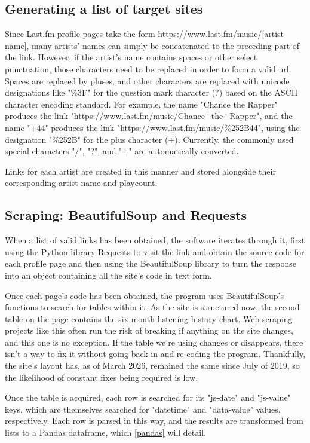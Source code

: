 \subsection{Generating a list of target sites}

Since Last.fm profile pages take the form https://www.last.fm/music/[artist name], many artists' names can simply be concatenated to the preceding part of the link. However, if the artist's name contains spaces or other select punctuation, those characters need to be replaced in order to form a valid url. Spaces are replaced by pluses, and other characters are replaced with unicode designations like "\%3F" for the question mark character (?) based on the ASCII character encoding standard. For example, the name "Chance the Rapper" produces the link "https://www.last.fm/music/Chance+the+Rapper", and the name "+44" produces the link "https://www.last.fm/music/\%252B44", using the designation "\%252B" for the plus character (+). Currently, the commonly used special characters "/", "?", and "+" are automatically converted. 

Links for each artist are created in this manner and stored alongside their corresponding artist name and playcount.

\subsection{Scraping: BeautifulSoup and Requests}

When a list of valid links has been obtained, the software iterates through it, first using the Python library Requests to visit the link and obtain the source code for each profile page and then using the BeautifulSoup library to turn the response into an object containing all the site's code in text form.

Once each page's code has been obtained, the program uses BeautifulSoup's functions to search for tables within it. As the site is structured now, the second table on the page contains the six-month listening history chart. Web scraping projects like this often run the risk of breaking if anything on the site changes, and this one is no exception. If the table we're using changes or disappears, there isn't a way to fix it without going back in and re-coding the program. Thankfully, the site's layout has, as of March 2026, remained the same since July of 2019, so the likelihood of constant fixes being required is low.

Once the table is acquired, each row is searched for its "js-date" and "js-value" keys, which are themselves searched for "datetime" and "data-value" values, respectively. Each row is parsed in this way, and the results are transformed from lists to a Pandas dataframe, which \autoref{pandas} will detail.

